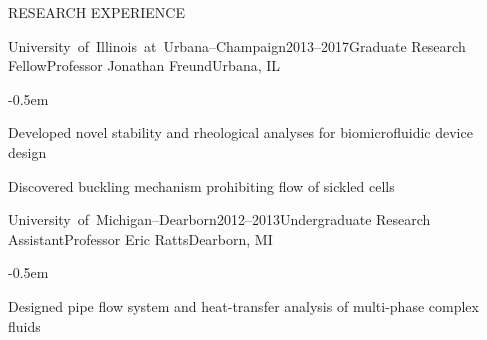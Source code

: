 \documentclass{resume} %
\newcommand{\sepss}{-0.5em}
\newcommand{\negspace}{-0.8em}
\newcommand\UIUC{\mbox{University of Illinois at Urbana--Champaign}}
\newcommand\UMD{\mbox{University of Michigan--Dearborn}}
\begin{document}
\begin{rSection}{{\Large R}ESEARCH EXPERIENCE}
\begin{myrSubsections}{\UIUC}{2013--2017}{Graduate Research Fellow}{Professor Jonathan Freund}{Urbana, IL} 
	\begin{list}{\textbullet}{\leftmargin=2.5em} 
	  	\itemsep \sepss
	  	\vspace{\negspace} 
        \item Developed novel stability and rheological analyses for biomicrofluidic device design
        \item Discovered buckling mechanism prohibiting flow of sickled cells
  	\end{list}
\end{myrSubsections}


\begin{myrSubsections}{\UMD}{2012--2013}{Undergraduate Research Assistant}{Professor Eric Ratts}{Dearborn, MI} 
	\begin{list}{\textbullet}{\leftmargin=2.5em} 
	  	\itemsep \sepss 
	  	\vspace{\negspace} 
		\item Designed pipe flow system and heat-transfer analysis of multi-phase complex fluids
  	\end{list}
\end{myrSubsections}

\end{rSection}
\end{document}
